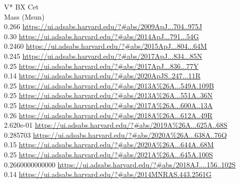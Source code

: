 V* BX Cet\\
Mass (Msun)\\
0.266 \url{https://ui.adsabs.harvard.edu/?#abs/2009ApJ...704..975J}\\
0.30 \url{https://ui.adsabs.harvard.edu/?#abs/2014ApJ...791...54G}\\
0.2460 \url{https://ui.adsabs.harvard.edu/?#abs/2015ApJ...804...64M}\\
0.245 \url{https://ui.adsabs.harvard.edu/?#abs/2017ApJ...834...85N}\\
0.25 \url{https://ui.adsabs.harvard.edu/?#abs/2017ApJ...836...77Y}\\
0.14 \url{https://ui.adsabs.harvard.edu/?#abs/2020ApJS..247...11R}\\
0.25 \url{https://ui.adsabs.harvard.edu/?#abs/2013A%26A...549A.109B}\\
0.25 \url{https://ui.adsabs.harvard.edu/?#abs/2013A%26A...551A..36N}\\
0.25 \url{https://ui.adsabs.harvard.edu/?#abs/2017A%26A...600A..13A}\\
0.26 \url{https://ui.adsabs.harvard.edu/?#abs/2018A%26A...612A..49R}\\
2.620e-01 \url{https://ui.adsabs.harvard.edu/?#abs/2019A%26A...625A..68S}\\
0.285703 \url{https://ui.adsabs.harvard.edu/?#abs/2020A%26A...638A..76Q}\\
0.15 \url{https://ui.adsabs.harvard.edu/?#abs/2020A%26A...644A..68M}\\
0.25 \url{https://ui.adsabs.harvard.edu/?#abs/2021A%26A...645A.100S}\\
0.2660000000000 \url{https://ui.adsabs.harvard.edu/?#abs/2018AJ....156..102S}\\
0.14 \url{https://ui.adsabs.harvard.edu/?#abs/2014MNRAS.443.2561G}\\


